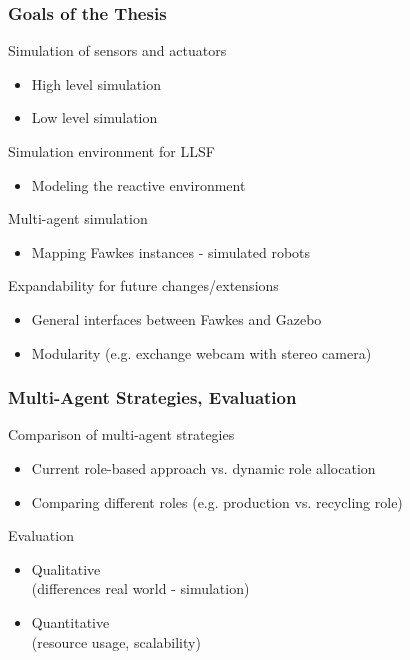 \documentclass[]{beamer}
\begin{document}
\begin{frame}
\frametitle{Goals of the Thesis}
Simulation of sensors and actuators
\begin{itemize}
\item High level simulation
\item Low level simulation
\end{itemize}
\pause
Simulation environment for LLSF
\begin{itemize}
\item Modeling the reactive environment
\end{itemize}
\pause
Multi-agent simulation
\begin{itemize}
\item Mapping Fawkes instances - simulated robots
\end{itemize}
\pause
Expandability for future changes/extensions
\begin{itemize}
\item General interfaces between Fawkes and Gazebo
\item Modularity (e.g. exchange webcam with stereo camera)
\end{itemize}
\end{frame}

\begin{frame}
\frametitle{Multi-Agent Strategies, Evaluation}
Comparison of multi-agent strategies
\begin{itemize}
\item Current role-based approach vs. dynamic role allocation
\item Comparing different roles (e.g. production vs. recycling role)
\end{itemize}
\pause
Evaluation
\begin{itemize}
\item Qualitative\\(differences real world - simulation)
\item Quantitative\\(resource usage, scalability)
\end{itemize}
\end{frame}
\end{document}
